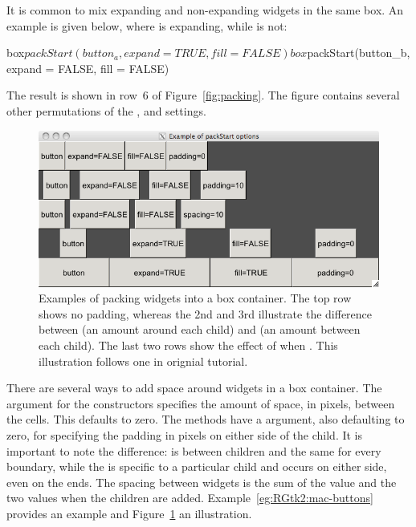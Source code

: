 It is common to mix expanding and non-expanding widgets in the same
box.
An example is given below, where  is expanding,
while  is not:
\begin{Schunk}
\begin{Sinput}
 box$packStart(button_a, expand = TRUE, fill = FALSE)
 box$packStart(button_b, expand = FALSE, fill = FALSE)
\end{Sinput}
\end{Schunk}
%
The result is shown in row~6 of Figure~\ref{fig:packing}.  The figure
contains several other permutations of the
,
 and
 settings.

\begin{figure}
  \centering
  \includegraphics[width=.85\textwidth]{ex-RGtk2-pack-start}
  \caption{Examples of packing widgets into a box container. The top
    row shows no padding, whereas the 2nd and 3rd illustrate the
    difference between  (an amount around each child)
    and  (an amount between each child). The last two
    rows show the effect of  when . This
    illustration follows one in orignial \GTK\/ tutorial.}
  \label{fig:RGtk2-pack-start}
\end{figure}

There are several ways to add space around widgets in a box container.
The  argument for the constructors
specifies the amount of space, in pixels, between the cells. This
defaults to zero. The  methods have a
 argument, also defaulting to zero,
for specifying the padding in pixels on either side of the child. It
is important to note the difference:  is between
children and the same for every boundary, while the  is
specific to a particular child and occurs on either side, even on the
ends. The spacing between widgets is the sum of the 
value and the two  values when the children are added.
Example~\ref{eg:RGtk2:mac-buttons} provides an example and
Figure~\ref{fig:RGtk2-pack-start} an illustration.

